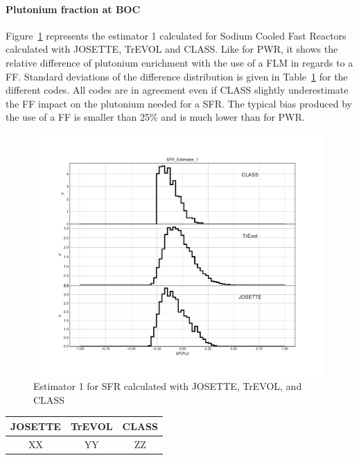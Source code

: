 \paragraph{Plutonium fraction at \gls{BOC}}

Figure~\ref{fig:Est1_SFR} represents the estimator 1 calculated for Sodium
Cooled Fast Reactors calculated with JOSETTE, TrEVOL and CLASS. Like for \gls{PWR}, it
shows the relative difference of plutonium enrichment with the use of a \gls{FLM} in
regards to a \gls{FF}. Standard deviations of the difference distribution is given in
Table~\ref{table:Est1Dev_SFR} for the different codes. All codes are in
agreement even if CLASS slightly underestimate the \gls{FF} impact on the plutonium
needed for a SFR. The typical bias produced by the use of a \gls{FF} is smaller than
25\% and is much lower than for \gls{PWR}.   

\begin{figure}[h]
	\begin{center}
		\includegraphics[width = 0.99\textwidth]{../../Feature_1/RAW_DATA/FIG/SFR_Estimator_1.pdf}
		\caption{Estimator 1 for SFR calculated with JOSETTE, TrEVOL, and CLASS}
		\label{fig:Est1_SFR}
	\end{center}
\end{figure}

\begin{table}[h]
	\begin{center}
		\begin{tabular}{|c||c||c|}
			\hline 
				JOSETTE & TrEVOL & CLASS \\
			\hline
				XX & YY & ZZ \\
		\end{tabular}
	\end{center}
	\label{table:Est1Dev_SFR}
\end{table}

